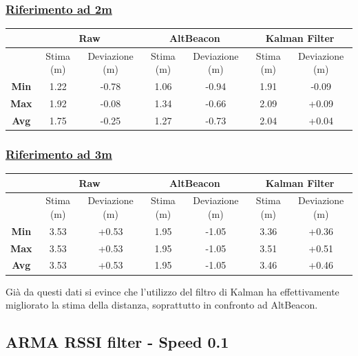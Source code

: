 \newpage
\subsubsection{\underline{Riferimento ad 2m}}
\begin{center}
	\begin{tabular}{|c|c|c|c|c|c|c|}
		\hline 
		& \multicolumn{2}{|c|}{\textbf{Raw}} &\multicolumn{2}{|c|}{\textbf{AltBeacon}} &\multicolumn{2}{|c|}{\textbf{Kalman Filter}}\\ 
		\hline 
		& Stima (m) & Deviazione (m) & Stima (m) & Deviazione (m) & Stima (m)& Deviazione (m)\\ 
		\hline 
		\textbf{Min} & 1.22	& -0.78 & 1.06	& -0.94 & 1.91	& -0.09 \\ 
		\hline 
		\textbf{Max} & 1.92	& -0.08 & 1.34	& -0.66 & 2.09	& +0.09	\\ 
		\hline 
		\textbf{Avg} & 1.75	& -0.25 & 1.27 	& -0.73 & 2.04 	& +0.04	\\ 
		\hline 
	\end{tabular}
\end{center}

\subsubsection{\underline{Riferimento ad 3m}}
\begin{center}
	\begin{tabular}{|c|c|c|c|c|c|c|}
		\hline 
		& \multicolumn{2}{|c|}{\textbf{Raw}} &\multicolumn{2}{|c|}{\textbf{AltBeacon}} &\multicolumn{2}{|c|}{\textbf{Kalman Filter}}\\ 
		\hline 
		& Stima (m) & Deviazione (m) & Stima (m) & Deviazione (m) & Stima (m)& Deviazione (m)\\ 
		\hline 
		\textbf{Min} & 3.53	& +0.53 & 1.95	& -1.05 & 3.36	& +0.36 \\ 
		\hline 
		\textbf{Max} & 3.53	& +0.53 & 1.95	& -1.05 & 3.51	& +0.51	\\ 
		\hline 
		\textbf{Avg} & 3.53	& +0.53 & 1.95 	& -1.05 & 3.46 	& +0.46	\\ 
		\hline 
	\end{tabular}
\end{center}

Già da questi dati si evince che l'utilizzo del filtro di Kalman ha effettivamente migliorato la stima della distanza, soprattutto in confronto ad AltBeacon.

\newpage
\subsection{ARMA RSSI filter - Speed 0.1}

